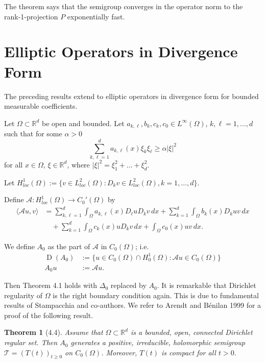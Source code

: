 \documentclass[11pt]{article}
\newtheorem{theorem}{Theorem}[section]
\DeclareMathOperator{\dom}{D}
\begin{document}
The theorem says that the semigroup converges in the operator norm to the rank-1-projection $P$ exponentially fast.

\section{Elliptic Operators in Divergence Form}

The preceding results extend to elliptic operators in divergence form for bounded measurable coefficients.

Let $\Omega \subset \mathbb{R}^d$ be open and bounded. Let $a_{k,\ell}, b_k, c_k, c_0 \in L^\infty(\Omega)$, $k, \ell = 1, \ldots, d$ such that for some $\alpha > 0$
\begin{equation}
\sum_{k,\ell=1}^d a_{k,\ell}(x) \xi_k \xi_\ell \geq \alpha |\xi|^2
\end{equation}
for all $x \in \Omega$, $\xi \in \mathbb{R}^d$, where $|\xi|^2 = \xi_1^2 + \ldots + \xi_d^2$.

Let $H^1_{loc}(\Omega) := \{v \in L^2_{loc}(\Omega) : D_k v \in L^2_{loc}(\Omega), k = 1, \ldots, d\}$.

Define $\mathcal{A} : H^1_{loc}(\Omega) \to C_0'(\Omega)$ by
\begin{align}
\langle \mathcal{A}u, v \rangle &= \sum_{k,\ell=1}^d \int_\Omega a_{k,\ell}(x) D_\ell u D_k v \, dx + \sum_{k=1}^d \int_\Omega b_k(x) D_k u v \, dx\\
&\quad + \sum_{k=1}^d \int_\Omega c_k(x) u D_k v \, dx + \int_\Omega c_0(x) u v \, dx.
\end{align}

We define $A_0$ as the part of $\mathcal{A}$ in $C_0(\Omega)$; i.e.
\begin{align}
\dom(A_0) &:= \{u \in C_0(\Omega) \cap H^1_0(\Omega) : \mathcal{A}u \in C_0(\Omega)\}\\
A_0 u &:= \mathcal{A}u.
\end{align}

Then Theorem 4.1 holds with $\Delta_0$ replaced by $A_0$. It is remarkable that Dirichlet regularity of $\Omega$ is the right boundary condition again. This is due to fundamental results of Stampacchia and co-authors. We refer to Arendt and Bénilan 1999 for a proof of the following result.

\begin{theorem}[4.4]
Assume that $\Omega \subset \mathbb{R}^d$ is a bounded, open, connected Dirichlet regular set. Then $A_0$ generates a positive, irreducible, holomorphic semigroup $\mathcal{T} = (T(t))_{t \geq 0}$ on $C_0(\Omega)$. Moreover, $T(t)$ is compact for all $t > 0$.
\end{theorem}
\end{document}
